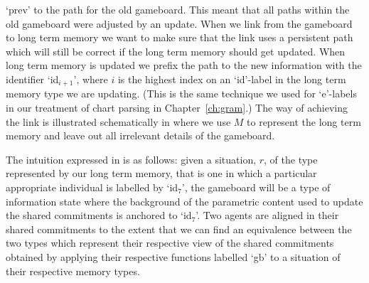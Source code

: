 `prev' to the path for the old gameboard.  This meant that all paths
within the old gameboard were adjusted by an update.  When we link from the
gameboard to long term memory we want to make sure that the link uses
a persistent path which will still be correct if the long term memory
should get updated.  When long term memory is updated we prefix the
path to the new information with 
the identifier `id$_{i+1}$', where $i$ is the highest index on an
`id'-label in the long term memory type we are updating.  (This is the
same technique we used for `e'-labels in our treatment of chart parsing
in Chapter~\ref{ch:gram}.) The way of achieving the link is
illustrated schematically in \nexteg{} where we use $M$ to represent
the long term memory \preveg{} and leave out all irrelevant details of
the gameboard.
\begin{ex} 
\label{ex:tisSamLeaves}
\end{ex} 
The intuition expressed in \preveg{} is as follows:  given a
situation, $r$,
of the type represented by our long term memory, that is one in which
a particular appropriate individual is labelled by `id$_7$', the gameboard will
be a type of information state where the background of the parametric
content used to update the shared commitments is anchored to `id$_7$'.  Two agents are aligned in their shared
commitments to the extent that we can find an equivalence between the
two types which represent their respective view of the shared
commitments obtained by applying their respective functions labelled `gb' to a
situation of their respective memory types. 


